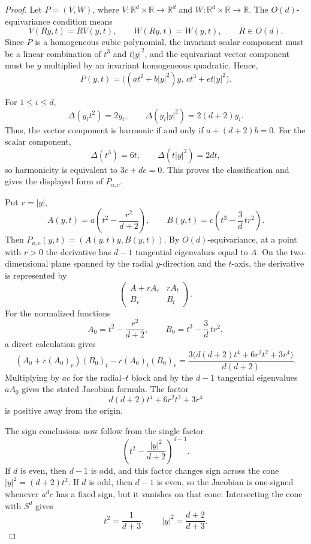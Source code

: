 \documentclass[10pt]{amsart}
\numberwithin{equation}{section}
\theoremstyle{definition}
\newcommand{\R}{\mathbb R}
\begin{document}
\begin{proof}
Let \(P=(V,W)\), where \(V:\R^d\times\R\to\R^d\) and
\(W:\R^d\times\R\to\R\). The \(O(d)\)-equivariance condition means
\[
        V(Ry,t)=RV(y,t),
        \qquad
        W(Ry,t)=W(y,t),
        \qquad R\in O(d).
\]
Since \(P\) is a homogeneous cubic polynomial, the invariant scalar component
must be a linear combination of \(t^3\) and \(t|y|^2\), and the equivariant
vector component must be \(y\) multiplied by an invariant homogeneous
quadratic. Hence,
\[
        P(y,t)=\bigl((a t^2+b|y|^2)y,\,c t^3+e t|y|^2\bigr).
\]

For \(1\le i\le d\),
\[
        \Delta(y_i t^2)=2y_i,
        \qquad
        \Delta(y_i|y|^2)=2(d+2)y_i.
\]
Thus, the vector component is harmonic if and only if \(a+(d+2)b=0\). For the
scalar component,
\[
        \Delta(t^3)=6t,
        \qquad
        \Delta(t|y|^2)=2dt,
\]
so harmonicity is equivalent to \(3c+de=0\). This proves the classification
and gives the displayed form of \(P_{a,c}\).

Put \(r=|y|\),
\[
        A(y,t)=a\left(t^2-\frac{r^2}{d+2}\right),
        \qquad
        B(y,t)=c\left(t^3-\frac3d\,tr^2\right).
\]
Then \(P_{a,c}(y,t)=(A(y,t)y,B(y,t))\). By \(O(d)\)-equivariance, at a point
with \(r>0\) the derivative has \(d-1\) tangential eigenvalues equal to
\(A\). On the two-dimensional plane spanned by the radial \(y\)-direction and
the \(t\)-axis, the derivative is represented by
\[
        \begin{pmatrix}
        A+rA_r & rA_t\\
        B_r & B_t
        \end{pmatrix}.
\]
For the normalized functions
\[
        A_0=t^2-\frac{r^2}{d+2},
        \qquad
        B_0=t^3-\frac3d\,tr^2,
\]
a direct calculation gives
\[
        (A_0+r(A_0)_r)(B_0)_t-r(A_0)_t(B_0)_r
        =
        \frac{3\bigl(d(d+2)t^4+6r^2t^2+3r^4\bigr)}{d(d+2)}.
\]
Multiplying by \(a c\) for the radial--\(t\) block and by the \(d-1\)
tangential eigenvalues \(aA_0\) gives the stated Jacobian formula. The
factor
\[
        d(d+2)t^4+6r^2t^2+3r^4
\]
is positive away from the origin.

The sign conclusions now follow from the single factor
\[
        \left(t^2-\frac{|y|^2}{d+2}\right)^{d-1}.
\]
If \(d\) is even, then \(d-1\) is odd, and this factor changes sign across
the cone \(|y|^2=(d+2)t^2\). If \(d\) is odd, then \(d-1\) is even, so the
Jacobian is one-signed whenever \(a^dc\) has a fixed sign, but it vanishes on
that cone. Intersecting the cone with \(S^d\) gives
\[
        t^2=\frac1{d+3},
        \qquad
        |y|^2=\frac{d+2}{d+3}.
\]


\end{proof}
\end{document}
